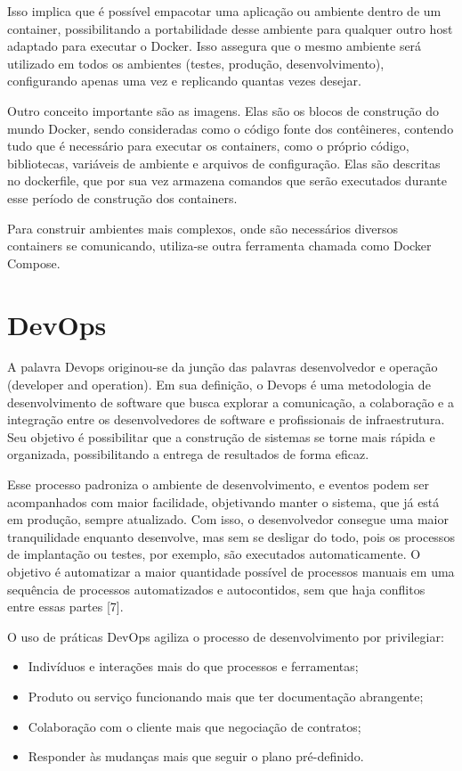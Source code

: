 Isso implica que é possível empacotar uma aplicação ou ambiente dentro de um container, possibilitando a portabilidade desse ambiente para qualquer outro host adaptado para executar o Docker. Isso assegura que o mesmo ambiente será utilizado em todos os ambientes (testes, produção, desenvolvimento), configurando apenas uma vez e replicando quantas vezes desejar.

Outro conceito importante são as imagens. Elas são os blocos de construção do mundo Docker, sendo consideradas como o código fonte dos contêineres, contendo tudo que é necessário para executar os containers, como o próprio código, bibliotecas, variáveis de ambiente e arquivos de configuração. Elas são descritas no dockerfile, que por sua vez armazena comandos que serão executados durante esse período de construção dos containers. 

Para construir ambientes mais complexos, onde são necessários diversos containers se comunicando, utiliza-se outra ferramenta chamada como Docker Compose.

\section{DevOps}

A palavra Devops originou-se da junção das palavras desenvolvedor e operação (developer and operation). Em sua definição, o Devops é uma metodologia de desenvolvimento de software que busca explorar a comunicação, a colaboração e a integração entre os desenvolvedores de software e profissionais de infraestrutura. Seu objetivo é possibilitar que a construção de sistemas se torne mais rápida e organizada, possibilitando a entrega de resultados de forma eficaz. 

Esse processo padroniza o ambiente de desenvolvimento, e eventos podem ser acompanhados com maior facilidade, objetivando manter o sistema, que já está em produção, sempre atualizado. Com isso, o desenvolvedor consegue uma maior tranquilidade enquanto desenvolve, mas sem se desligar do todo, pois os processos de implantação ou testes, por exemplo, são executados automaticamente. O objetivo é automatizar a maior quantidade possível de processos manuais em uma sequência de processos automatizados e autocontidos, sem que haja conflitos entre essas partes [7].

O uso de práticas DevOps agiliza o processo de desenvolvimento por privilegiar:
\begin{itemize}
    \item Indivíduos e interações mais do que processos e ferramentas;
    \item Produto ou serviço funcionando mais que ter documentação abrangente;
    \item Colaboração com o cliente mais que negociação de contratos;
    \item Responder às mudanças mais que seguir o plano pré-definido.
\end{itemize}

